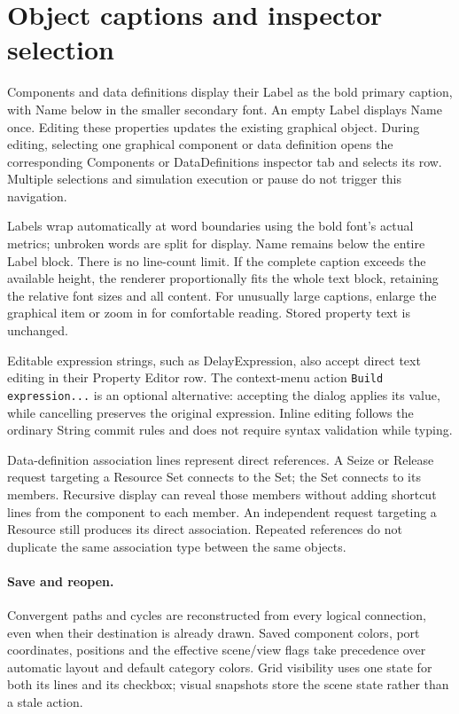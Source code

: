 \section{Object captions and inspector selection}
Components and data definitions display their Label as the bold primary caption,
with Name below in the smaller secondary font. An empty Label displays Name once.
Editing these properties updates the existing graphical object.
During editing, selecting one graphical component or data definition opens the
corresponding Components or DataDefinitions inspector tab and selects its row.
Multiple selections and simulation execution or pause do not trigger this navigation.

Labels wrap automatically at word boundaries using the bold font's actual metrics;
unbroken words are split for display. Name remains below the entire Label block.
There is no line-count limit. If the complete caption exceeds the available height,
the renderer proportionally fits the whole text block, retaining the relative font
sizes and all content. For unusually large captions, enlarge the graphical item or
zoom in for comfortable reading. Stored property text is unchanged.

Editable expression strings, such as DelayExpression, also accept direct text
editing in their Property Editor row. The context-menu action \texttt{Build
expression...} is an optional alternative: accepting the dialog applies its value,
while cancelling preserves the original expression. Inline editing follows the
ordinary String commit rules and does not require syntax validation while typing.

Data-definition association lines represent direct references. A Seize or Release
request targeting a Resource Set connects to the Set; the Set connects to its
members. Recursive display can reveal those members without adding shortcut lines
from the component to each member. An independent request targeting a Resource
still produces its direct association. Repeated references do not duplicate the
same association type between the same objects.

\paragraph{Save and reopen.}
Convergent paths and cycles are reconstructed from every logical connection, even
when their destination is already drawn. Saved component colors, port coordinates,
positions and the effective scene/view flags take precedence over automatic layout
and default category colors. Grid visibility uses one state for both its lines and
its checkbox; visual snapshots store the scene state rather than a stale action.


